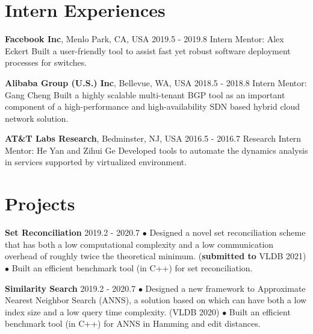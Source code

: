 \documentclass[line,11pt,letter]{includes/cls/myRes}
\begin{document}
\begin{resume}
\section{Intern Experiences}
\vspace{-4pt}
{\setlength{\parskip}{0pt}
{\bf Facebook Inc}, Menlo Park, CA, USA \hfill 2019.5 - 2019.8\break
{\hspace*{1em} Intern \hfill Mentor: Alex Eckert\break}
{\hspace*{1em} Built a user-friendly tool to assist fast yet robust software deployment processes for switches. \hfill \phantom{al} \break}
}\sspace

{\setlength{\parskip}{0pt}
{\bf Alibaba Group (U.S.) Inc}, Bellevue, WA, USA \hfill 2018.5 - 2018.8\break
{\hspace*{1em} Intern \hfill Mentor: Gang Cheng\break}
{\hspace*{1em} Built a highly scalable multi-tenant BGP tool as an important component of a high-performance and high-availability SDN based hybrid cloud network solution.  \hfill \phantom{for-alignment} \break}
}\sspace

{\setlength{\parskip}{0pt}
{\bf AT\&T Labs Research}, Bedminster, NJ, USA \hfill 2016.5 - 2016.7\break
{\hspace*{1em} Research Intern \hfill Mentor: He Yan and Zihui Ge\break}
{\hspace*{1em} Developed tools to automate the dynamics analysis in services supported by virtualized environment.\break}
}\negspace
\section{Projects}

\vspace{-4pt}
{\setlength{\parskip}{0pt}
{\bf Set Reconciliation} \hfill 2019.2 - 2020.7\break
{\hspace*{1em} $\bullet$ Designed a novel set reconciliation scheme that has both a low computational complexity and a low communication overhead of
roughly twice the theoretical minimum. ({\bf submitted to} VLDB 2021)\hfill\break}
{\hspace*{1em} $\bullet$ Built an efficient benchmark tool (in C++) for set reconciliation.\hfill\break}
\sspace
}

{\setlength{\parskip}{0pt}
{\bf Similarity Search} \hfill 2019.2 - 2020.7\break
{\hspace*{1em} $\bullet$ Designed a new framework to Approximate Nearest Neighbor Search (ANNS), a solution based on which can have both a low index size and a low query time complexity. (VLDB 2020)\hfill\break}
{\hspace*{1em} $\bullet$ Built an efficient benchmark tool (in C++) for ANNS in Hamming and edit distances.\hfill\break}
\sspace
}


\end{resume}
\end{document}
